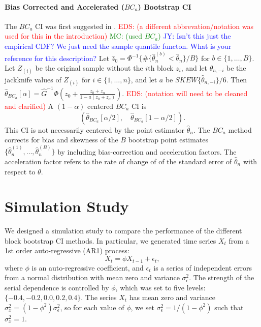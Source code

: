 \documentclass[12pt, letterpaper, titlepage]{article}
\newcommand{\jy}[1]{\textcolor{blue}{JY: #1}}
\newcommand{\eds}[1]{\textcolor{red}{EDS: (#1)}}
\newcommand{\mc}[1]{\textcolor{green}{MC: (#1)}}
\begin{document}
\paragraph{Bias Corrected and Accelerated ($BC_a$) Bootstrap CI}
The $BC_a$ CI was first suggested in \citet{efron1987better}.
\eds{a different abbrevation/notation was used for this in the introduction}
\mc{used $BC_a$}
\jy{Isn't this just the empirical CDF? We just need the sample quantile functon.
  What is your reference for this description?}
Let $\hat{z}_0 = \Phi^{-1}\{\#\{\hat\theta_n^{(b)} < \hat{\theta}_n\} / B\}$
for $b \in \{1, \ldots, B\}$. 
Let $Z_{(i)}$ be the original sample without the $i$th block $z_i$, and let
$\hat{\theta}_{n, -i}$ be the jackknife values of $Z_{(i)}$
for $i \in \{1, \ldots, n\}$, 
and let $a$ be $SKEW\{\hat{\theta}_{n, -i}\} / 6$. Then
$\hat\theta_{BC_a}[\alpha] = \hat{G}^{-1}\Phi(z_0 + \frac{z_{0} +
  z_{\alpha}}{1 - a(z_{0} + z_{\alpha})}).$
\eds{notation will need to be cleaned and clarified}
A $(1 - \alpha)$ centered $BC_a$ CI is
\[
(\hat\theta_{BC_a}[\alpha/2], \quad
\hat\theta_{BC_a}[1 - \alpha/2]).
\]
This CI is not necessarily centered by the point estimator $\hat\theta_n$. The
$BC_a$ method corrects for bias and skewness of the $B$ bootstrap point
estimates $\{\hat\theta_n^{(1)}, \ldots, \hat\theta_n^{(B)}\}$ by including
bias-correction and acceleration factors. The acceleration factor refers to
the 
rate of change of of the standard error of $\hat\theta_n$ with respect to
$\theta$.


\section{Simulation Study}
\label{sec:simu}

We designed a simulation study to compare the performance of the different
block
bootstrap CI methods. In particular, we generated time series $X_t$
from a 1st order auto-regressive (AR1) process:
\[
X_t = \phi X_{t-1} + \epsilon_t,
\]
where $\phi$ is an auto-regressive coefficient, and $\epsilon_t$ is a series of
independent errors from a normal distribution with mean zero and variance
$\sigma_{\epsilon}^2$. The strength of the serial dependence is controlled by
$\phi$, which was set to five levels: $\{-0.4, -0.2, 0.0, 0.2, 0.4\}$.
The series $X_t$ has mean zero and variance
$\sigma_x^2 = (1 - \phi^2) \sigma_{\epsilon}^2$, so for each value of $\phi$,
we
set $\sigma_{\epsilon}^2 = 1 / (1 - \phi^2)$ such that $\sigma_x^2 = 1$.
\end{document}
